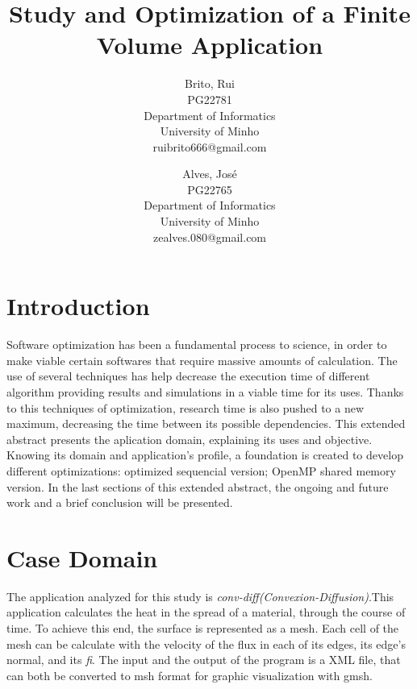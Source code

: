 \documentclass[a4paper,10pt,openright,openbib,twocolumn]{article}
\begin{document}
\begin{multicols}{2}
\title{Study and Optimization of a Finite Volume Application}
\author{
    Brito, Rui\\
    PG22781\\
    Department of Informatics\\
    University of Minho\\
    ruibrito666@gmail.com
  \and
    Alves, José\\
    PG22765\\
    Department of Informatics\\
    University of Minho\\
    zealves.080@gmail.com
}
\date{}
\maketitle
\end{multicols}

\section{Introduction}

Software optimization has been a fundamental process to science, in order to make viable certain softwares that require massive amounts of calculation. The use of several techniques has help decrease the execution time of different algorithm providing results and simulations in a viable time for its uses. Thanks to this techniques of optimization, research time is also pushed to a new maximum, decreasing the time between its possible dependencies.%
This extended abstract presents the aplication domain, explaining its uses and objective. Knowing its domain and application's profile, a foundation is created to develop different optimizations: optimized sequencial version; OpenMP shared memory version. In the last sections of this extended abstract, the ongoing and future work and a brief conclusion will be presented.

\section{Case Domain}

The application analyzed for this study is \emph{conv-diff(Convexion-Diffusion)}.This application calculates the heat in the spread of a material, through the course of time. To achieve this end, the surface is represented as a mesh. Each cell of the mesh can be calculate with the velocity of the flux in each of its edges, its edge's normal, and its \emph{fi}.
The input and the output of the program is a XML file, that can both be converted to msh format for graphic visualization with gmsh.
\end{document}
